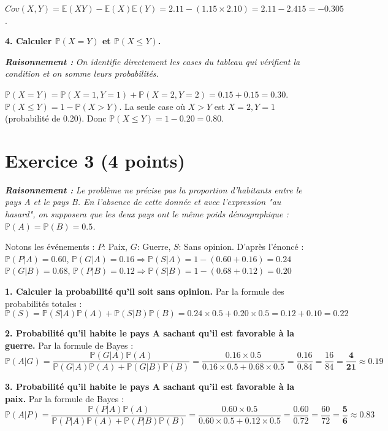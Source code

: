 \documentclass[11pt,a4paper]{article}
\newcommand{\raisonnement}[1]{
    \vspace{0.2cm}
    \noindent\textcolor{blue!70!black}{
        \textbf{\textit{Raisonnement : }} \textit{#1}
    }
    \vspace{0.2cm}
}
\begin{document}
$Cov(X,Y) = \mathbb{E}(XY) - \mathbb{E}(X)\mathbb{E}(Y) = 2.11 - (1.15 \times 2.10) = 2.11 - 2.415 = \mathbf{-0.305}$.

\textbf{4. Calculer $\mathbb{P}(X=Y)$ et $\mathbb{P}(X \le Y)$.}
\raisonnement{On identifie directement les cases du tableau qui vérifient la condition et on somme leurs probabilités.}

$\mathbb{P}(X=Y) = \mathbb{P}(X=1, Y=1) + \mathbb{P}(X=2, Y=2) = 0.15 + 0.15 = \mathbf{0.30}$. \\
$\mathbb{P}(X \le Y) = 1 - \mathbb{P}(X > Y)$.
La seule case où $X > Y$ est $X=2, Y=1$ (probabilité de 0.20).
Donc $\mathbb{P}(X \le Y) = 1 - 0.20 = \mathbf{0.80}$.

\vspace{0.5cm}
\section*{Exercice 3 (4 points)}

\raisonnement{Le problème ne précise pas la proportion d'habitants entre le pays A et le pays B. En l'absence de cette donnée et avec l'expression "au hasard", on supposera que les deux pays ont le même poids démographique : $\mathbb{P}(A) = \mathbb{P}(B) = 0.5$.}

Notons les événements : $P$: Paix, $G$: Guerre, $S$: Sans opinion.
D'après l'énoncé :
$\mathbb{P}(P|A) = 0.60$, $\mathbb{P}(G|A) = 0.16 \Rightarrow \mathbb{P}(S|A) = 1 - (0.60 + 0.16) = 0.24$ \\
$\mathbb{P}(G|B) = 0.68$, $\mathbb{P}(P|B) = 0.12 \Rightarrow \mathbb{P}(S|B) = 1 - (0.68 + 0.12) = 0.20$

\textbf{1. Calculer la probabilité qu'il soit sans opinion.}
Par la formule des probabilités totales :
$$ \mathbb{P}(S) = \mathbb{P}(S|A)\mathbb{P}(A) + \mathbb{P}(S|B)\mathbb{P}(B) = 0.24 \times 0.5 + 0.20 \times 0.5 = 0.12 + 0.10 = \mathbf{0.22} $$

\textbf{2. Probabilité qu'il habite le pays A sachant qu'il est favorable à la guerre.}
Par la formule de Bayes :
$$ \mathbb{P}(A|G) = \frac{\mathbb{P}(G|A)\mathbb{P}(A)}{\mathbb{P}(G|A)\mathbb{P}(A) + \mathbb{P}(G|B)\mathbb{P}(B)} = \frac{0.16 \times 0.5}{0.16 \times 0.5 + 0.68 \times 0.5} = \frac{0.16}{0.84} = \frac{16}{84} = \mathbf{\frac{4}{21}} \approx 0.19 $$

\textbf{3. Probabilité qu'il habite le pays A sachant qu'il est favorable à la paix.}
Par la formule de Bayes :
$$ \mathbb{P}(A|P) = \frac{\mathbb{P}(P|A)\mathbb{P}(A)}{\mathbb{P}(P|A)\mathbb{P}(A) + \mathbb{P}(P|B)\mathbb{P}(B)} = \frac{0.60 \times 0.5}{0.60 \times 0.5 + 0.12 \times 0.5} = \frac{0.60}{0.72} = \frac{60}{72} = \mathbf{\frac{5}{6}} \approx 0.83 $$
\end{document}
